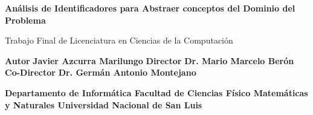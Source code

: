 \documentclass[a4paper,12pt]{report}
\begin{document}
\begin{titlepage}
    \centering
    \vfill
    {\bfseries\huge
	Análisis de Identificadores para Abstraer conceptos del 		Dominio del Problema
     \vskip1.3cm       
   }  
   
{\bfseries\Large

Trabajo Final de Licenciatura en Ciencias de la Computación
\vskip1cm
}

 {\bfseries\large
	Autor
	\vskip0.1cm   
   }
   {\bfseries\Large
Javier Azcurra Marilungo
   \vskip1cm
   }
   {\bfseries\large
	Director
	\vskip0.1cm   
   }
   {\bfseries\Large
Dr. Mario Marcelo Berón
   \vskip1cm
   }
   {\bfseries\large
	Co-Director
	\vskip0.1cm   
   }
   {\bfseries\Large
Dr. Germán Antonio Montejano
   \vskip1cm
   }

{\bfseries\large
Departamento de Informática
\vskip0.5cm
Facultad de Ciencias Físico Matemáticas y Naturales
\vskip0.5cm
Universidad Nacional de San Luis
}     
  
\end{titlepage}

\renewcommand{\abstractname}{\Large Resumen}
\end{document}
